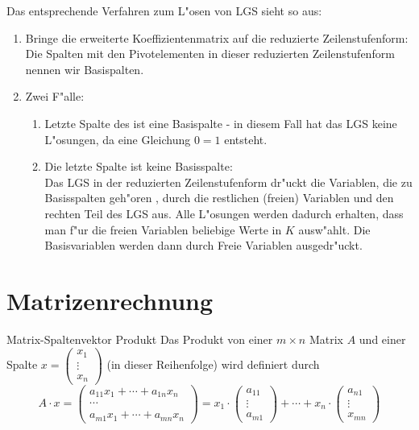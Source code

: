 \documentclass[oneside,fontsize=11pt,paper=a4,BCOR=0mm,DIV=12,automark,headsepline]{scrbook}
\theoremstyle{remark}
\theoremstyle{definition}
\theoremstyle{definition}
\theoremstyle{remark}
\begin{document}
Das entsprechende Verfahren zum L"osen von LGS sieht so aus:
\begin{relation}
  \begin{enumerate}
  \item Bringe die erweiterte Koeffizientenmatrix auf die reduzierte
    Zeilenstufenform: \\
    Die Spalten mit den Pivotelementen in dieser reduzierten Zeilenstufenform
    nennen wir Basispalten.
  \item Zwei F"alle:
    \begin{enumerate}
    \item Letzte Spalte des ist eine Basispalte - in diesem Fall hat das LGS keine
      L"osungen, da eine Gleichung \(0=1\) entsteht.
    \item Die letzte Spalte ist keine Basisspalte: \\
      Das LGS in der reduzierten Zeilenstufenform dr"uckt die Variablen, die zu
      Basisspalten geh"oren , durch die restlichen (freien) Variablen und den
      rechten Teil des LGS aus. Alle L"osungen werden dadurch erhalten, dass
      man f"ur die freien Variablen beliebige Werte in \(K\) ausw"ahlt. Die
      Basisvariablen werden dann durch Freie Variablen ausgedr"uckt.
    \end{enumerate}
  \end{enumerate}
\end{relation}

\section{Matrizenrechnung}
\label{sec:org0f3e63e}
\begin{definition}{Matrix-Spaltenvektor Produkt}{}
  Das Produkt von einer \(m\times n\) Matrix \(A\) und einer Spalte \(x=\begin{pmatrix}
    x_1\\\vdots\\x_n
  \end{pmatrix}\) (in dieser
  Reihenfolge) wird definiert durch \[A\cdot x = 
    \begin{pmatrix}
      a_{11}x_1 + \cdots + a_{1n}x_n \\
      \cdots \\
      a_{m1}x_1 + \cdots + a_{mn}x_n
    \end{pmatrix}
    =x_1\cdot\begin{pmatrix}
      a_{11}\\\vdots\\a_{m1}
    \end{pmatrix} + \cdots + 
    x_n\cdot\begin{pmatrix}
      a_{n1}\\\vdots\\x_{mn}
    \end{pmatrix}
  \]
\end{definition}
\end{document}
